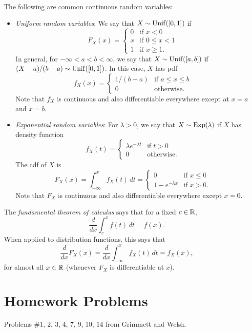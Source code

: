 \begin{example}
  The following are common continuous random variables:
  \begin{itemize}
    \item \emph{Uniform random variables}: We say that
      $X \sim \operatorname{Unif}([0, 1])$ if
      \[
        F_X(x) =
        \begin{cases}
          0 & \text{if $x < 0$} \\
          x & \text{if $0 \le x < 1$} \\
          1 & \text{if $x \ge 1$}.
        \end{cases}
      \]
      In general, for $-\infty < a < b < \infty$, we
      say that $X \sim \operatorname{Unif}([a, b])$ if
      $(X - a) / (b - a) \sim \operatorname{Unif}([0, 1])$. In
      this case, $X$ has pdf
      \[
        f_X(x) =
        \begin{cases}
          1 / (b - a) & \text{if $a \le x \le b$} \\
          0 & \text{otherwise}.
        \end{cases}
      \]
      Note that $f_X$ is continuous and
      also differentiable everywhere except at
      $x = a$ and $x = b$.
    \item \emph{Exponential random variables}: For
      $\lambda > 0$, we say that $X \sim \operatorname{Exp}(\lambda)$
      if $X$ has density function
      \[
        f_X(t) =
        \begin{cases}
          \lambda e^{-\lambda t} & \text{if $t > 0$} \\
          0 & \text{otherwise}.
        \end{cases}
      \]
      The cdf of $X$ is
      \[
        F_X(x) = \int_{-\infty}^x f_X(t) \, dt =
        \begin{cases}
          0 & \text{if $x \le 0$} \\
          1 - e^{-\lambda x} & \text{if $x > 0$}.
        \end{cases}
      \]
      Note that $F_X$ is continuous and also
      differentiable everywhere except $x = 0$.
  \end{itemize}
\end{example}

\begin{remark}
  The \emph{fundamental theorem of calculus} says that
  for a fixed $c \in \mathbb{R}$,
  \[
    \frac{d}{dx} \int_{c}^x f(t) \, dt = f(x).
  \]
  When applied to distribution functions, this says
  that
  \[
    \frac{d}{dx} F_X(x) =
    \frac{d}{dx} \int_{-\infty}^x f_X(t) \, dt
    = f_X(x),
  \]
  for almost all $x \in \mathbb{R}$ (whenever $F_X$ is
  differentiable at $x$).
\end{remark}

\section{Homework Problems}
Problems \#1, 2, 3, 4, 7, 9, 10, 14 from Grimmett and Welsh.
